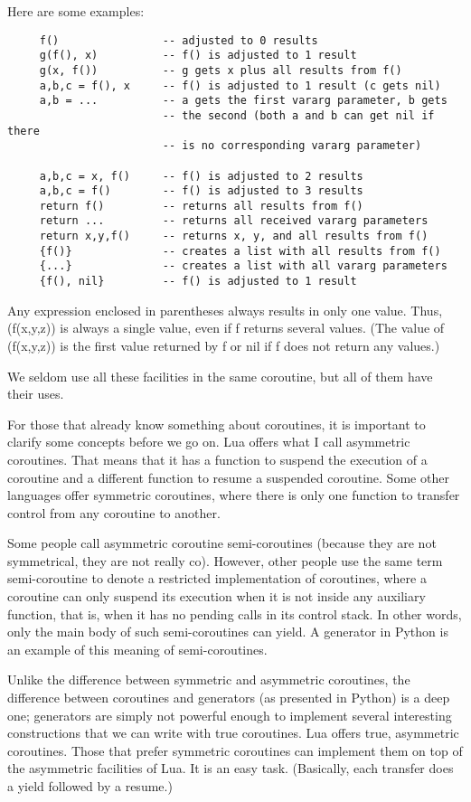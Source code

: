 \begin{itemize}
Here are some examples:
\begin{lstlisting}
     f()                -- adjusted to 0 results
     g(f(), x)          -- f() is adjusted to 1 result
     g(x, f())          -- g gets x plus all results from f()
     a,b,c = f(), x     -- f() is adjusted to 1 result (c gets nil)
     a,b = ...          -- a gets the first vararg parameter, b gets
                        -- the second (both a and b can get nil if there
                        -- is no corresponding vararg parameter)
     
     a,b,c = x, f()     -- f() is adjusted to 2 results
     a,b,c = f()        -- f() is adjusted to 3 results
     return f()         -- returns all results from f()
     return ...         -- returns all received vararg parameters
     return x,y,f()     -- returns x, y, and all results from f()
     {f()}              -- creates a list with all results from f()
     {...}              -- creates a list with all vararg parameters
     {f(), nil}         -- f() is adjusted to 1 result
\end{lstlisting}

Any expression enclosed in parentheses always results in only one value. Thus, (f(x,y,z)) is always a single value, even if f returns several values. (The value of (f(x,y,z)) is the first value returned by f or nil if f does not return any values.) 

We seldom use all these facilities in the same coroutine, but all of them have their uses.

For those that already know something about coroutines, it is important to clarify some concepts before we go on. Lua offers what I call asymmetric coroutines. That means that it has a function to suspend the execution of a coroutine and a different function to resume a suspended coroutine. Some other languages offer symmetric coroutines, where there is only one function to transfer control from any coroutine to another.

Some people call asymmetric coroutine semi-coroutines (because they are not symmetrical, they are not really co). However, other people use the same term semi-coroutine to denote a restricted implementation of coroutines, where a coroutine can only suspend its execution when it is not inside any auxiliary function, that is, when it has no pending calls in its control stack. In other words, only the main body of such semi-coroutines can yield. A generator in Python is an example of this meaning of semi-coroutines.

Unlike the difference between symmetric and asymmetric coroutines, the difference between coroutines and generators (as presented in Python) is a deep one; generators are simply not powerful enough to implement several interesting constructions that we can write with true coroutines. Lua offers true, asymmetric coroutines. Those that prefer symmetric coroutines can implement them on top of the asymmetric facilities of Lua. It is an easy task. (Basically, each transfer does a yield followed by a resume.)



\end{itemize}

